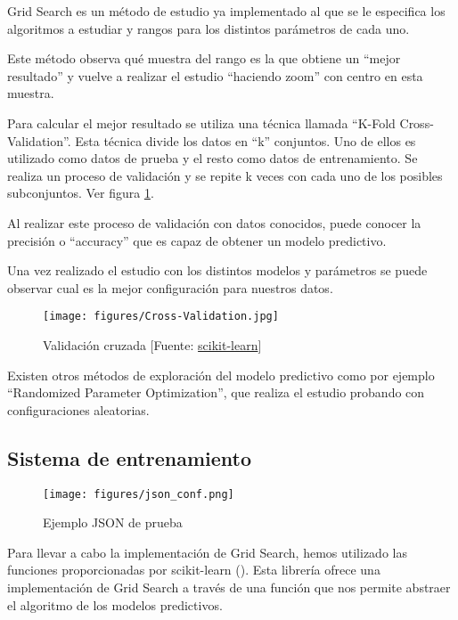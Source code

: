 	Grid Search es un método de estudio ya implementado al que se le especifica los algoritmos a estudiar y rangos para los distintos parámetros de cada uno. 

	Este método observa qué muestra del rango es la que obtiene un ``mejor resultado'' y vuelve a realizar el estudio ``haciendo zoom'' con centro en esta muestra.

	Para calcular el mejor resultado se utiliza una técnica llamada ``K-Fold Cross-Validation''. Esta técnica divide los datos en ``k'' conjuntos. Uno de ellos es utilizado como datos de prueba y el resto como datos de entrenamiento. Se realiza un proceso de validación y se repite k veces con cada uno de los posibles subconjuntos. Ver figura \ref{cross}.

	Al realizar este proceso de validación con datos conocidos, puede conocer la precisión o ``accuracy'' que es capaz de obtener un modelo predictivo.

	Una vez realizado el estudio con los distintos modelos y parámetros se puede observar cual es la mejor configuración para nuestros datos.

	\begin{figure}[htb]
		\begin{center}
			\texttt{[image: figures/Cross-Validation.jpg]}
			\caption{Validación cruzada [Fuente: \href{www.scikit-learn.org}{scikit-learn}] \label{cross}}
		\end{center}	
	\end{figure}
	
	Existen otros métodos de exploración del modelo predictivo como por ejemplo ``Randomized Parameter Optimization'', que realiza el estudio probando con configuraciones aleatorias.

	\subsection{Sistema de entrenamiento}
	
	\begin{figure}[htb]
		\begin{center}
			\texttt{[image: figures/json\_conf.png]}
			\caption{Ejemplo JSON de prueba \label{json}}
		\end{center}
	\end{figure}

	Para llevar a cabo la implementación de Grid Search, hemos utilizado las funciones proporcionadas por scikit-learn (\cite{ARP:Scikit:2017}).
	Esta librería ofrece una implementación de Grid Search a través de una función que nos permite abstraer el algoritmo de los modelos predictivos.

